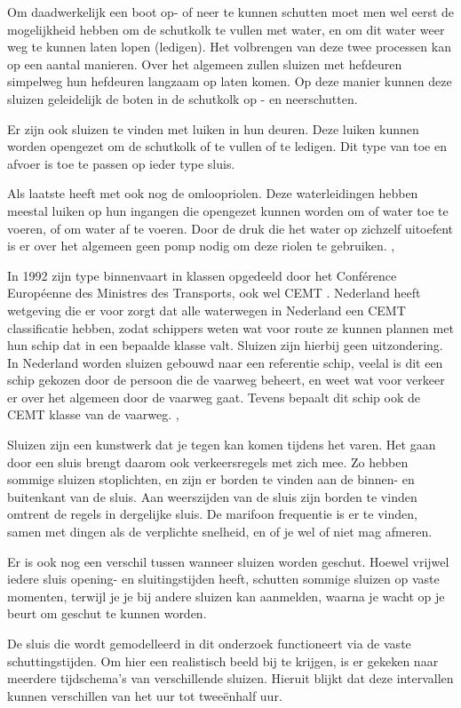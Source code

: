 \documentclass[../verslag.tex]{subfiles}
\begin{document}
Om daadwerkelijk een boot op- of neer te kunnen schutten moet men wel eerst de mogelijkheid hebben om de schutkolk te vullen met water, en om dit water weer weg te kunnen laten lopen (ledigen). Het volbrengen van deze twee processen kan op een aantal manieren. Over het algemeen zullen sluizen met hefdeuren simpelweg hun hefdeuren langzaam op laten komen. Op deze manier kunnen deze sluizen geleidelijk de boten in de schutkolk op - en neerschutten. \cite{bezuijen_2000}

Er zijn ook sluizen te vinden met luiken in hun deuren. Deze luiken kunnen worden opengezet om de schutkolk of te vullen of te ledigen. Dit type van toe en afvoer is toe te passen op ieder type sluis. \cite{bezuijen_2000}

Als laatste heeft met ook nog de omloopriolen. Deze waterleidingen hebben meestal luiken op hun ingangen die opengezet kunnen worden om of water toe te voeren, of om water af te voeren. Door de druk die het water op zichzelf uitoefent is er over het algemeen geen pomp nodig om deze riolen te gebruiken. \cite{gww_2020}, \cite{bezuijen_2000}

In 1992 zijn type binnenvaart in klassen opgedeeld door het Conférence Européenne des Ministres des Transports, ook wel CEMT \cite{cemt_1992}. Nederland heeft wetgeving die er voor zorgt dat alle waterwegen in Nederland een CEMT classificatie hebben, zodat schippers weten wat voor route ze kunnen plannen met hun schip dat in een bepaalde klasse valt. Sluizen zijn hierbij geen uitzondering. In Nederland worden sluizen gebouwd naar een referentie schip, veelal is dit een schip gekozen door de persoon die de vaarweg beheert, en weet wat voor verkeer er over het algemeen door de vaarweg gaat. Tevens bepaalt dit schip ook de CEMT klasse van de vaarweg. \cite{cemt_1992}, \cite{rws_2020}

Sluizen zijn een kunstwerk dat je tegen kan komen tijdens het varen. Het gaan door een sluis brengt daarom ook verkeersregels met zich mee. Zo hebben sommige sluizen stoplichten, en zijn er borden te vinden aan de binnen- en buitenkant van de sluis. Aan weerszijden van de sluis zijn borden te vinden omtrent de regels in dergelijke sluis. De marifoon frequentie is er te vinden, samen met dingen als de verplichte snelheid, en of je wel of niet mag afmeren. \cite{zeilen_2013}

Er is ook nog een verschil tussen wanneer sluizen worden geschut. Hoewel vrijwel iedere sluis opening- en sluitingstijden heeft, schutten sommige sluizen op vaste momenten, terwijl je je bij andere sluizen kan aanmelden, waarna je wacht op je beurt om geschut te kunnen worden.

De sluis die wordt gemodelleerd in dit onderzoek functioneert via de vaste schuttingstijden. Om hier een realistisch beeld bij te krijgen, is er gekeken naar meerdere tijdschema's van verschillende sluizen. Hieruit blijkt dat deze intervallen kunnen verschillen van het uur tot tweeënhalf uur.
\end{document}
